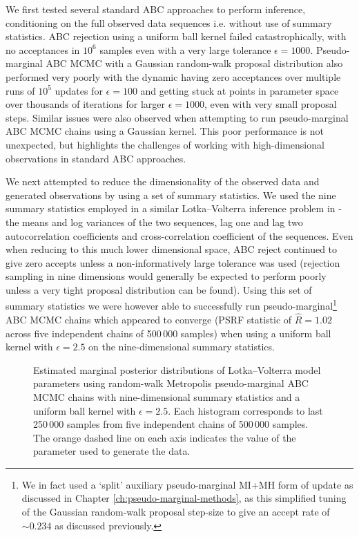 We first tested several standard \ac{ABC} approaches to perform inference, conditioning on the full observed data sequences i.e. without use of summary statistics. \ac{ABC} rejection using a uniform ball kernel failed catastrophically, with no acceptances in $10^6$ samples even with a very large tolerance $\epsilon = 1000$. Pseudo-marginal \ac{ABC} \ac{MCMC} with a Gaussian random-walk proposal distribution also performed very poorly with the dynamic having zero acceptances over multiple runs of $10^5$ updates for $\epsilon=100$ and getting stuck at points in parameter space over thousands of iterations for larger $\epsilon=1000$, even with very small proposal steps. Similar issues were also observed when attempting to run pseudo-marginal \ac{ABC} \ac{MCMC} chains using a Gaussian kernel. This poor performance is not unexpected, but highlights the challenges of working with high-dimensional observations in standard \ac{ABC} approaches.

We next attempted to reduce the dimensionality of the observed data and generated observations by using a set of summary statistics. We used the nine summary statistics employed in a similar Lotka--Volterra inference problem in \citep{papamakarios2016epsilon} - the means and log variances of the two sequences, lag one and lag two autocorrelation coefficients and cross-correlation coefficient of the sequences. Even when reducing to this much lower dimensional space, \ac{ABC} reject continued to give zero accepts unless a non-informatively large tolerance was used (rejection sampling in nine dimensions would generally be expected to perform poorly unless a very tight proposal distribution can be found). Using this set of summary statistics we were however able to successfully run pseudo-marginal\footnote{We in fact used a `split' auxiliary pseudo-marginal \ac{MI}+\ac{MH} form of update as discussed in Chapter \ref{ch:pseudo-marginal-methods}, as this simplified tuning of the Gaussian random-walk proposal step-size to give an accept rate of $\sim 0.234$ as discussed previously.} \ac{ABC} \ac{MCMC} chains which appeared to converge (\ac{PSRF} statistic of $\hat{R}=1.02$ across five independent chains of 500\,000 samples) when using a uniform ball kernel with $\epsilon = 2.5$ on the nine-dimensional summary statistics. 

\begin{figure}
\centering
{}
\caption[Lotka--Volterra model posterior histograms (1).]{Estimated marginal posterior distributions of Lotka--Volterra model parameters using random-walk Metropolis pseudo-marginal \ac{ABC} \ac{MCMC} chains with nine-dimensional summary statistics and a uniform ball kernel with $\epsilon = 2.5$. Each histogram corresponds to last 250\,000 samples from five independent chains of 500\,000 samples. The orange dashed line on each axis indicates the value of the parameter used to generate the data.}
\label{fig:lotka-volterra-param-posterior-abc-summary}
\end{figure}


